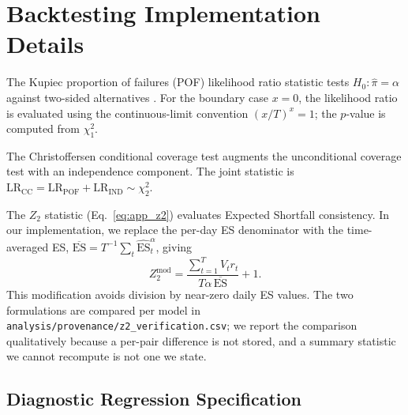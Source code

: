 \documentclass[preprint,11pt,authoryear]{elsarticle}
\newcommand{\ES}{\mathrm{ES}}
\newcommand{\1}{\boldsymbol{1}}
\begin{document}
\begin{table}[htbp]
	\centering
	\caption{GBM-QR hyperparameter sensitivity on S\&P~500
		(\nSupTunedSeries{} base forecasters, $\alpha=0.01$). Metrics are
		pooled across those \nSupTunedSeries{} base models.}
	\label{tab:gbm_tuned}
	\scriptsize
	
\end{table}


\section{Backtesting Implementation Details}
\label{app:backtesting}

The Kupiec proportion of failures (POF) likelihood ratio statistic
tests $H_0:\hat\pi=\alpha$ against two-sided alternatives
\citep{kupiec1995}. For the boundary case $x=0$, the likelihood
ratio is evaluated using the continuous-limit convention
$(x/T)^x=1$; the $p$-value is computed from $\chi^2_1$.

The Christoffersen conditional coverage test \citep{christoffersen1998}
augments the unconditional coverage test with an independence component.
The joint statistic is $\mathrm{LR}_{\mathrm{CC}}=
\mathrm{LR}_{\mathrm{POF}}+\mathrm{LR}_{\mathrm{IND}}\sim\chi^2_2$.

The $Z_2$ statistic (Eq.~\ref{eq:app_z2}) evaluates Expected Shortfall
consistency. In our implementation, we replace the per-day ES
denominator with the time-averaged ES,
$\overline{\ES}=T^{-1}\sum_{t}\widehat{\ES}_t^\alpha$, giving
\begin{equation}
	\label{eq:app_z2_mod}
	Z_2^{\mathrm{mod}}
	=
	\frac{\sum_{t=1}^{T}V_t r_t}
	{T\alpha\,\overline{\ES}}
	+1.
\end{equation}
This modification avoids division by near-zero daily ES values. The two
formulations are compared per model in
\texttt{analysis/provenance/z2\_verification.csv}; we report the comparison
qualitatively because a per-pair difference is not stored, and a summary
statistic we cannot recompute is not one we state.


\subsection{Diagnostic Regression Specification}
\label{app:diag_regression_spec}
\end{document}
